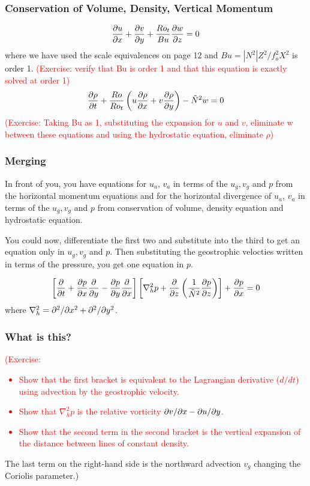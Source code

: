 \documentclass[xcolor=dvipsnames]{beamer}
\begin{document}
\begin{frame}
\frametitle{Conservation of Volume, Density, Vertical Momentum}
\label{density_eqn}
\[
\frac {\partial u}{\partial x} + \frac {\partial v}{\partial y} + \frac{Ro_t}{Bu} \frac {\partial w}{\partial z} = 0
\]
where we have used the scale equivalences on page 12 and $Bu = |N^2|Z^2/f_o^2X^2$ is order 1. \textcolor{red}{(Exercise: verify that Bu is order 1 and that this equation is exactly solved at order 1)}
\[
\frac {\partial \rho}{\partial t} + \frac{Ro}{Ro_t} \left( u \frac {\partial \rho}{\partial x} + v \frac {\partial \rho}{\partial y} \right) - \tilde N^2 w = 0
\]
\textcolor{red}{(Exercise: Taking Bu as 1, substituting the expansion for $u$ and $v$, eliminate w between these equations and using the hydrostatic equation, eliminate $\rho$)}

\end{frame}
\begin{frame}
\frametitle{Merging}

In front of you, you have equations for $u_a$, $v_a$  in terms of the $u_g, v_g$ and $p$ from the horizontal momentum equations and for the horizontal divergence of $u_a$, $v_a$ in terms of the $u_g, v_g$ and $p$ from conservation of volume, density equation and hydrostatic equation.

You could now, differentiate the first two and substitute into the third to get an equation only in $u_g, v_g$ and $p$.  Then substituting the geostrophic velocties written in terms of the pressure, you get one equation in $p$.

\[
\left[ \frac {\partial}{\partial t} + \frac {\partial p}{\partial x} \frac {\partial}{\partial y} - \frac {\partial p}{\partial y} \frac {\partial}{\partial x}\right] \left[ \nabla_h^2 p + \frac {\partial}{\partial z} \left( \frac {1}{\tilde N^2} \frac {\partial p}{\partial z} \right)\right] + \frac {\partial p}{\partial x} = 0\]
where $\nabla_h^2 = \partial^2/\partial x^2 + \partial^2/\partial y^2$.
\end{frame}

\begin{frame}
\frametitle{What is this?}

\textcolor{red}{(Exercise: 
\begin{itemize}
\item Show that the first bracket is equivalent to the Lagrangian derivative ($d/dt$) using advection by the geostrophic velocity.
\item Show that $\nabla_h^2 p$ is the relative vorticity $\partial v/\partial x - \partial u/\partial y$.
\item Show that the second term in the second bracket is the vertical expansion of the distance between lines of constant density.
\end{itemize}}
The last term on the right-hand side is the northward advection $v_g$ changing the Coriolis parameter.)
\end{frame}
\end{document}
